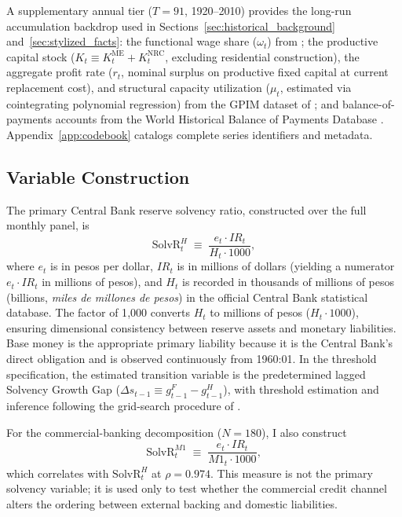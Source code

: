 A supplementary annual tier ($T = 91$, 1920--2010) provides the long-run accumulation backdrop used in Sections~\ref{sec:historical_background} and~\ref{sec:stylized_facts}: the functional wage share ($\omega_t$) from \citet{Astorga2023}; the productive capital stock ($K_t \equiv K^{\text{ME}}_t + K^{\text{NRC}}_t$, excluding residential construction), the aggregate profit rate ($r_t$, nominal surplus on productive fixed capital at current replacement cost), and structural capacity utilization ($\mu_t$, estimated via cointegrating polynomial regression) from the GPIM dataset of \citet{Polanco2026}; and balance-of-payments accounts from the World Historical Balance of Payments Database \citep{NievasPiketty2025}. Appendix~\ref{app:codebook} catalogs complete series identifiers and metadata.

\subsection{Variable Construction}
\label{sec:variable_construction}

The primary Central Bank reserve solvency ratio, constructed over the full monthly panel, is
\begin{equation}
	\text{SolvR}^H_t \;\equiv\; \frac{e_t \cdot IR_t}{H_t \cdot 1000},
	\label{eq:solvr_h}
\end{equation}
where $e_t$ is in pesos per dollar, $IR_t$ is in millions of dollars (yielding a numerator $e_t \cdot IR_t$ in millions of pesos), and $H_t$ is recorded in thousands of millions of pesos (billions, \emph{miles de millones de pesos}) in the official Central Bank statistical database. The factor of 1{,}000 converts $H_t$ to millions of pesos ($H_t \cdot 1000$), ensuring dimensional consistency between reserve assets and monetary liabilities. Base money is the appropriate primary liability because it is the Central Bank's direct obligation and is observed continuously from 1960:01. In the threshold specification, the estimated transition variable is the predetermined lagged Solvency Growth Gap ($\Delta s_{t-1} \equiv g^F_{t-1} - g^H_{t-1}$), with threshold estimation and inference following the grid-search procedure of \citet{Hansen1999}.

For the commercial-banking decomposition ($N = 180$), I also construct
\[
\text{SolvR}^{M1}_t \;\equiv\; \frac{e_t \cdot IR_t}{M1_t \cdot 1000},
\]
which correlates with $\text{SolvR}^H_t$ at $\rho = 0.974$. This measure is not the primary solvency variable; it is used only to test whether the commercial credit channel alters the ordering between external backing and domestic liabilities.

